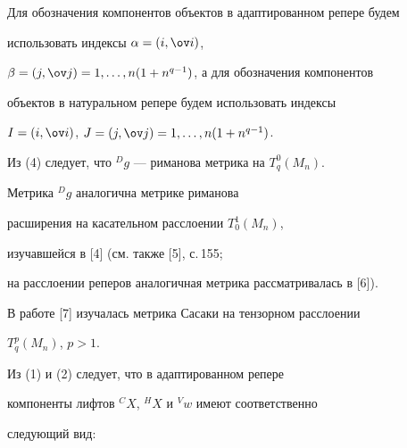 Для обозначения компонентов объектов в адаптированном репере будем


использовать индексы $\alpha=(i,{\ov i})$,


$\beta=(j,{\ov j})=1,\dotsc,n(1+n^{q-1})$, а для обозначения компонентов


объектов в  натуральном репере будем использовать индексы


$I=(i,{\ov i})$, $J=(j,{\ov j})=1,\dotsc,n(1+n^{q-1})$.





Из (4) следует, что  ${}^Dg$ --- риманова метрика на $T^0_q(M_n)$.








\begin{notenonum}


Метрика ${}^Dg$ аналогична метрике риманова


расширения на касательном расслоении $T^1_0(M_n)$,


изучавшейся в [4] (см. также [5], с.\,155;


на расслоении реперов аналогичная метрика рассматривалась в [6]).


В работе [7] изучалась метрика Сасаки на тензорном расслоении


$T^p_q(M_n)$, $p>1$.


\end{notenonum}





Из (1) и (2) следует, что в адаптированном репере


компоненты лифтов ${}^CX$, ${}^HX$ и ${}^Vw$ имеют соответственно


следующий вид:













